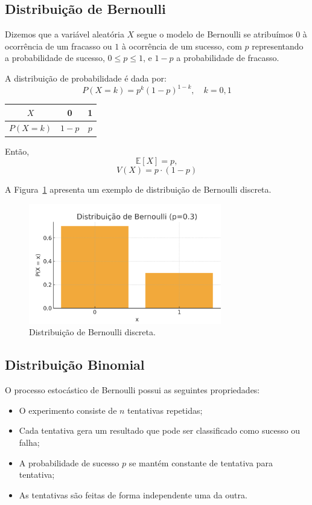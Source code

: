 \documentclass{article}
\begin{document}
\subsection{Distribuição de Bernoulli}
Dizemos que a variável aleatória $X$ segue o modelo de Bernoulli se atribuímos $0$ à ocorrência de um fracasso ou $1$ à ocorrência de um sucesso, com $p$ representando a probabilidade de sucesso,  
$0 \leq p \leq 1$, e $1 - p$ a probabilidade de fracasso.

A distribuição de probabilidade é dada por:
    $$
    P(X = k) = p^k (1 - p)^{1 - k}, \quad k = 0, 1
    $$

    \begin{center}
    \begin{tabular}{c|cc}
    $X$ & 0 & 1 \\
    \hline
    $P(X = k)$ & $1 - p$ & $p$
    \end{tabular}
    \end{center}

Então,
    $$
    \mathbb{E}[X] = p,
    $$
    $$
    V(X) = p \cdot (1-p)
    $$

A Figura~\ref{fig:dist_disc_bernoulli} apresenta um exemplo de distribuição de Bernoulli discreta.

\begin{figure}[H]
    \centering
    \includegraphics[width=0.75\textwidth]{figuras/dist_disc_bernoulli.png}
    \caption{Distribuição de Bernoulli discreta.}
    \label{fig:dist_disc_bernoulli}
\end{figure}

\subsection{Distribuição Binomial}
O processo estocástico de Bernoulli possui as seguintes propriedades:
\begin{itemize}
    \item O experimento consiste de $n$ tentativas repetidas;
    \item Cada tentativa gera um resultado que pode ser classificado como sucesso ou falha;
    \item A probabilidade de sucesso $p$ se mantém constante de tentativa para tentativa;
    \item As tentativas são feitas de forma independente uma da outra.
\end{itemize}
\end{document}
